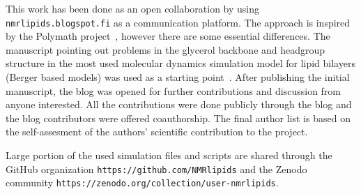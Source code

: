 \documentclass[pre,aps,floatfix,authordate1-4,twocolumn]{revtex4-1}
\begin{document}
This work has been done as an open collaboration by using \texttt{nmrlipids.blogspot.fi} as a communication platform.
The approach is inspired by the Polymath project~\cite{gowers09}, however there are some essential differences. 
The manuscript pointing out problems in the glycerol backbone and
headgroup structure in the most used molecular dynamics simulation model for lipid bilayers (Berger based models) was used as a starting point~\cite{ollila13}.
After publishing the initial manuscript, the blog was opened for further contributions and discussion from anyone interested. 
All the contributions were done publicly through the blog and the blog contributors were offered coauthorship. The final author list
is based on the self-assesment of the authors' scientific contribution to the project.

Large portion of the used simulation files and scripts are shared through the GitHub organization \texttt{https://github.com/NMRlipids}
and the Zenodo community \texttt{https://zenodo.org/collection/user-nmrlipids}.
\end{document}
